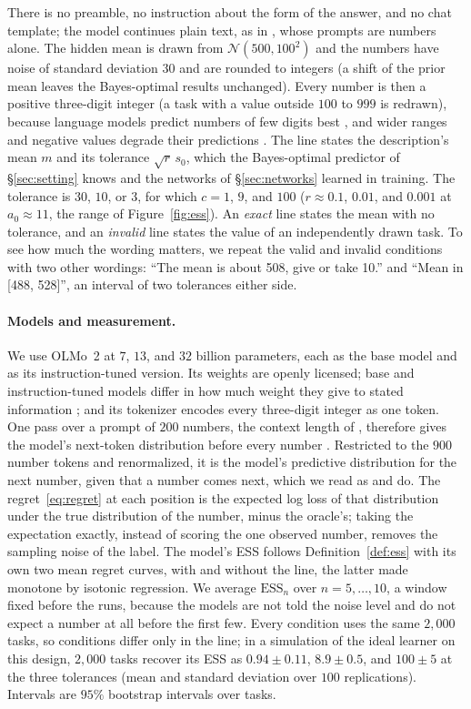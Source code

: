 \documentclass[10pt]{article}
\newcommand{\ess}{\mathrm{ESS}}
\begin{document}
\noindent There is no preamble, no instruction about the form of the answer, and no chat template; the model continues plain text, as in \citet{liu2025}, whose prompts are numbers alone. The hidden mean is drawn from $\mathcal{N}(500, 100^2)$ and the numbers have noise of standard deviation $30$ and are rounded to integers (a shift of the prior mean leaves the Bayes-optimal results unchanged). Every number is then a positive three-digit integer (a task with a value outside $100$ to $999$ is redrawn), because language models predict numbers of few digits best \citep{gruver2023}, and wider ranges and negative values degrade their predictions \citep{requeima2024}. The line states the description's mean $m$ and its tolerance $\sqrt{r}\,s_0$, which the Bayes-optimal predictor of \S\ref{sec:setting} knows and the networks of \S\ref{sec:networks} learned in training. The tolerance is $30$, $10$, or $3$, for which $c = 1$, $9$, and $100$ ($r \approx 0.1$, $0.01$, and $0.001$ at $a_0 \approx 11$, the range of Figure~\ref{fig:ess}). An \emph{exact} line states the mean with no tolerance, and an \emph{invalid} line states the value of an independently drawn task. To see how much the wording matters, we repeat the valid and invalid conditions with two other wordings: ``The mean is about 508, give or take 10.'' and ``Mean in [488, 528]'', an interval of two tolerances either side.

\paragraph{Models and measurement.} We use OLMo~2 \citep{walsh2025} at $7$, $13$, and $32$ billion parameters, each as the base model and as its instruction-tuned version. Its weights are openly licensed; base and instruction-tuned models differ in how much weight they give to stated information \citep{gupta2025}; and its tokenizer encodes every three-digit integer as one token. One pass over a prompt of $200$ numbers, the context length of \citet{liu2025}, therefore gives the model's next-token distribution before every number \citep{kossen2024}. Restricted to the $900$ number tokens and renormalized, it is the model's predictive distribution for the next number, given that a number comes next, which we read as \citet{liu2025} and \citet{requeima2024} do. The regret~\eqref{eq:regret} at each position is the expected log loss of that distribution under the true distribution of the number, minus the oracle's; taking the expectation exactly, instead of scoring the one observed number, removes the sampling noise of the label. The model's ESS follows Definition~\ref{def:ess} with its own two mean regret curves, with and without the line, the latter made monotone by isotonic regression. We average $\ess_n$ over $n = 5, \dots, 10$, a window fixed before the runs, because the models are not told the noise level and do not expect a number at all before the first few. Every condition uses the same $2{,}000$ tasks, so conditions differ only in the line; in a simulation of the ideal learner on this design, $2{,}000$ tasks recover its ESS as $0.94 \pm 0.11$, $8.9 \pm 0.5$, and $100 \pm 5$ at the three tolerances (mean and standard deviation over $100$ replications). Intervals are $95\%$ bootstrap intervals over tasks.
\end{document}
